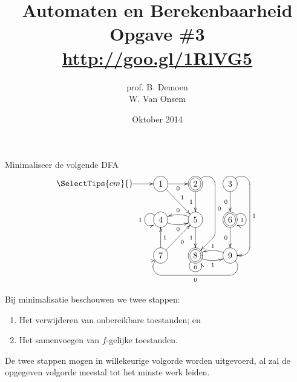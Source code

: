 \documentclass[a4paper]{article}
\title{Automaten en Berekenbaarheid\\Opgave \#3\\\url{http://goo.gl/1RlVG5}}
\author{prof. B. Demoen\\W. Van Onsem}
\date{Oktober 2014}
\begin{document}
\maketitle

\begin{question}
Minimaliseer de volgende DFA \\
\[  \entrymodifiers={++[o][F-]}
  \SelectTips{cm}{}
  \xymatrix {
    *{}\ar[r] &1\ar[r]_0\ar[rd]^1           &*++[o][F=]{2}\ar[d]_1\ar `ur_r[dd]`[dd]`_dl[dd]^0[dd] &3\ar`ur_d[dd]`_l[dd]^1[dd]\ar[d]_0\\
    *{}       &4\ar@(lu,ld)[]_1\ar@/_/[r]_0 &5\ar[d]_1\ar@/_/[l]_0                                 &*++[o][F=]{6}\ar@(ru,rd)[]_1\ar[d]_0\\
    *{}       &7\ar[u]_1\ar[ru]_0           &*++[o][F=]{8}\ar@(ld,rd)[]^0\ar@/_/[r]_1              &9\ar@/_/[l]_1\ar`dr_l[ll]`_ur[ll]^0 [ll]\\
} \]
\begin{answer}
Bij minimalisatie beschouwen we twee stappen:
\begin{enumerate}
 \item Het verwijderen van onbereikbare toestanden; en
 \item Het samenvoegen van $f$-gelijke toestanden.
\end{enumerate}
De twee stappen mogen in willekeurige volgorde worden uitgevoerd, al zal de opgegeven volgorde meestal tot het minste werk leiden.

\end{answer}
\end{question}
\end{document}
